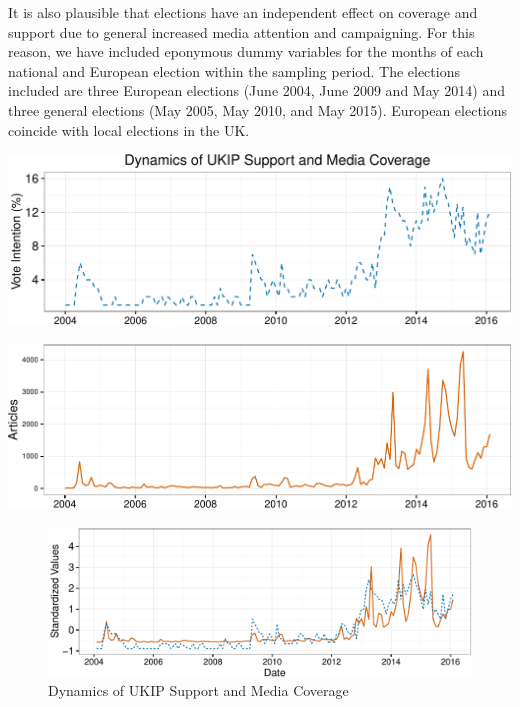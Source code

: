 \documentclass[12pt,]{article}
\makeatletter
\def\maxwidth{\ifdim\Gin@nat@width>\linewidth\linewidth
\else\Gin@nat@width\fi}
\let\Oldincludegraphics\includegraphics
\renewcommand{\includegraphics}[1]{\Oldincludegraphics[width=\maxwidth]{#1}}
\makeatother
\begin{document}
It is also plausible that elections have an independent effect on
coverage and support due to general increased media attention and
campaigning. For this reason, we have included eponymous dummy variables
for the months of each national and European election within the
sampling period. The elections included are three European elections
(June 2004, June 2009 and May 2014) and three general elections (May
2005, May 2010, and May 2015). European elections coincide with local
elections in the UK.

\setlength\parindent{0pt}

\includegraphics{ukip_media_files/figure-latex/unnamed-chunk-1-1.pdf}

\includegraphics{ukip_media_files/figure-latex/unnamed-chunk-2-1.pdf}

\begin{figure}[htbp]
\centering
\includegraphics{ukip_media_files/figure-latex/unnamed-chunk-3-1.pdf}
\caption{Dynamics of UKIP Support and Media Coverage}
\end{figure}

\setlength\parindent{24pt}
\end{document}
